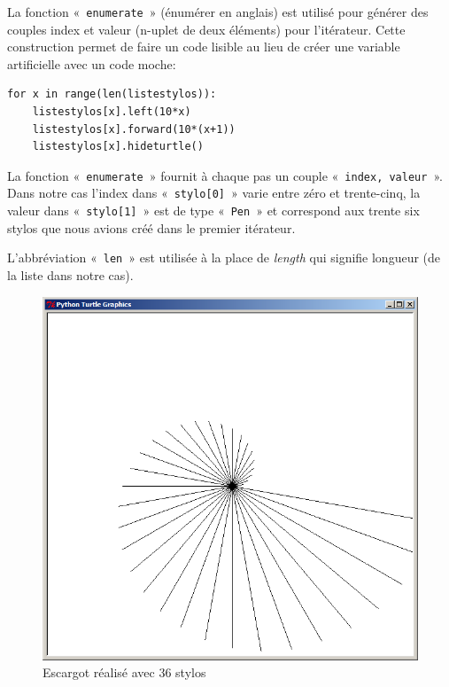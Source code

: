 La fonction « \texttt{enumerate} »  (énumérer en anglais) est utilisé pour générer des couples index et valeur (n-uplet de deux éléments) pour l'itérateur. Cette construction permet de faire un code lisible au lieu de créer une variable artificielle avec un code moche:\\

\begin{Verbatim}[frame=single,rulecolor=\color{gray}, label=moche]
for x in range(len(listestylos)): 
    listestylos[x].left(10*x)
    listestylos[x].forward(10*(x+1))
    listestylos[x].hideturtle()
\end{Verbatim}

La fonction « \texttt{enumerate} » fournit à chaque pas un couple « \texttt{index, valeur} ». Dans notre cas l'index dans « \texttt{stylo[0]} » varie entre zéro et trente-cinq, la valeur dans « \texttt{stylo[1]} » est de type « \texttt{Pen} » et correspond aux trente six stylos que nous avions créé dans le premier itérateur.

L'abbréviation « \texttt{len} » est utilisée à la place de \emph{length} qui signifie longueur (de la liste dans notre cas).

\begin{figure}[h!]
\centering
\includegraphics[scale=0.4]{images/escargot}
\caption{Escargot réalisé avec 36 stylos}\label{fig:escargot}
\end{figure}

